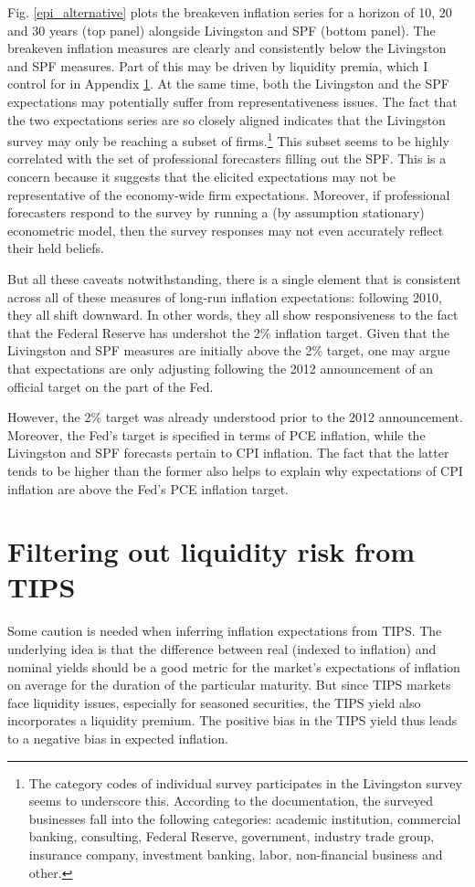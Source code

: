 \documentclass[11pt]{article}
\renewcommand{\[}{\begin{equation}}
\renewcommand{\]}{\end{equation}}
\begin{document}
Fig. \ref{epi_alternative} plots the breakeven inflation series for a horizon of 10, 20 and 30 years (top panel) alongside Livingston and SPF (bottom panel). The breakeven inflation measures are clearly and consistently below the Livingston and SPF measures. Part of this may be driven by liquidity premia, which I control for in Appendix \ref{TIPS}. At the same time, both the Livingston and the SPF expectations may potentially suffer from representativeness issues. The fact that the two expectations series are so closely aligned indicates that the Livingston survey may only be reaching a subset of firms.\footnote{The category codes of individual survey participates in the Livingston survey seems to underscore this. According to the documentation, the surveyed businesses fall into the following categories: academic institution, commercial banking, consulting, Federal Reserve, government, industry trade group, insurance company, investment banking, labor, non-financial business and other.} This subset seems to be highly correlated with the set of professional forecasters filling out the SPF. This is a concern because it suggests that the elicited expectations may not be representative of the economy-wide firm expectations. Moreover, if professional forecasters respond to the survey by running a (by assumption stationary) econometric model, then the survey responses may not even accurately reflect their held beliefs.

But all these caveats notwithstanding, there is a single element that is consistent across all of these measures of long-run inflation expectations: following 2010, they all shift downward. In other words, they all show responsiveness to the fact that the Federal Reserve has undershot the 2\% inflation target. Given that the Livingston and SPF measures are initially above the 2\% target, one may argue that expectations are only adjusting following the 2012 announcement of an official target on the part of the Fed. 

However, the 2\% target was already understood prior to the 2012 announcement. Moreover, the Fed's target is specified in terms of PCE inflation, while the Livingston and SPF forecasts pertain to CPI inflation. The fact that the latter tends to be higher than the former also helps to explain why expectations of CPI inflation are above the Fed's PCE inflation target. 

\section{Filtering out liquidity risk from TIPS}\label{TIPS} 
Some caution is needed when inferring inflation expectations from TIPS. The underlying idea is that the difference between real (indexed to inflation) and nominal yields should be a good metric for the market's expectations of inflation on average for the duration of the particular maturity. But since TIPS markets face liquidity issues, especially for seasoned securities, the TIPS yield also incorporates a liquidity premium. The positive bias in the TIPS yield thus leads to a negative bias in expected inflation.
\end{document}
